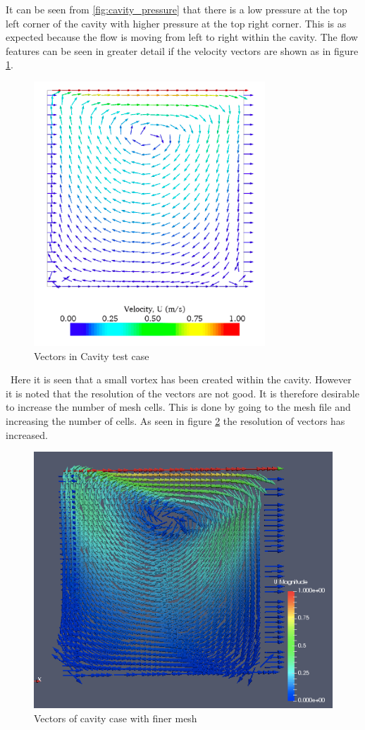 \documentclass[]{report}
\begin{document}
It can be seen from \ref{fig:cavity_pressure} that there is a low pressure at the top left corner of the cavity with higher pressure at the top right corner. This is as expected because the flow is moving from left to right within the cavity. The flow features can be seen in greater detail if the velocity vectors are shown as in figure \ref{fig:cavity_vector}. 
\newpage
\begin{figure}[h]
	\centering
	\includegraphics[scale=0.5]{cavity_vector.png}
	\caption{Vectors in Cavity test case}
	\label{fig:cavity_vector}
\end{figure}
\
Here it is seen that a small vortex has been created within the cavity. However it is noted that the resolution of the vectors are not good. It is therefore desirable to increase the number of mesh cells. This is done by going to the mesh file and increasing the number of cells. As seen in figure \ref{fig:cavity_fine} the resolution of vectors has increased.

\begin{figure}[h]
	\centering
	\includegraphics[scale=0.39]{cavity_fine.png}
	\caption{Vectors of cavity case with finer mesh}
	\label{fig:cavity_fine}
\end{figure}
\end{document}
